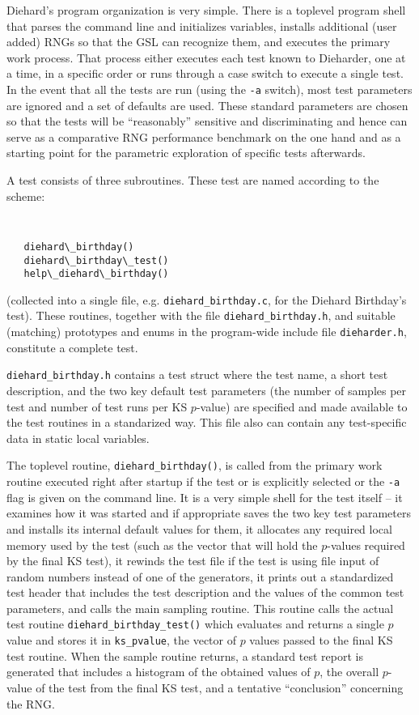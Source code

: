 \documentclass{book}
\begin{document}
Diehard's program organization is very simple.  There is a toplevel
program shell that parses the command line and initializes variables,
installs additional (user added) RNGs so that the GSL can recognize
them, and executes the primary work process.  That process either
executes each test known to Dieharder, one at a time, in a specific
order or runs through a case switch to execute a single test.  In the
event that all the tests are run (using the {\tt -a} switch), most test
parameters are ignored and a set of defaults are used.  These standard
parameters are chosen so that the tests will be ``reasonably'' sensitive
and discriminating and hence can serve as a comparative RNG performance
benchmark on the one hand and as a starting point for the parametric
exploration of specific tests afterwards.

A \die test consists of three subroutines.  These test are named
according to the scheme:  
{\tt
\begin{verbatim}
   diehard\_birthday()
   diehard\_birthday\_test()
   help\_diehard\_birthday()
\end{verbatim} 
} 
\noindent (collected into a single file, e.g. {\tt diehard\_birthday.c},
for the Diehard Birthday's test).  These routines, together with the
file {\tt diehard\_birthday.h}, and suitable (matching) prototypes and
enums in the program-wide include file {\tt dieharder.h}, constitute a
complete test.

{\tt diehard\_birthday.h} contains a test struct where the test name, a
short test description, and the two key default test parameters (the
number of samples per test and number of test runs per KS $p$-value) are
specified and made available to the test routines in a standarized way.
This file also can contain any test-specific data in static local
variables.

The toplevel routine, {\tt diehard\_birthday()}, is called from the
primary work routine executed right after startup if the test or is
explicitly selected or the {\tt -a} flag is given on the command line.
It is a very simple shell for the test itself -- it examines how it was
started and if appropriate saves the two key test parameters and
installs its internal default values for them, it allocates any required
local memory used by the test (such as the vector that will hold the
$p$-values required by the final KS test), it rewinds the test file if
the test is using file input of random numbers instead of one of the
generators, it prints out a standardized test header that includes the
test description and the values of the common test parameters, and
calls the main sampling routine.  This routine calls the actual test
routine {\tt diehard\_birthday\_test()} which evaluates and returns a
single $p$ value and stores it in {\tt ks\_pvalue}, the vector of $p$
values passed to the final KS test routine.  When the sample routine
returns, a standard test report is generated that includes a histogram
of the obtained values of $p$, the overall $p$-value of the test from
the final KS test, and a tentative ``conclusion'' concerning the RNG.
\end{document}

